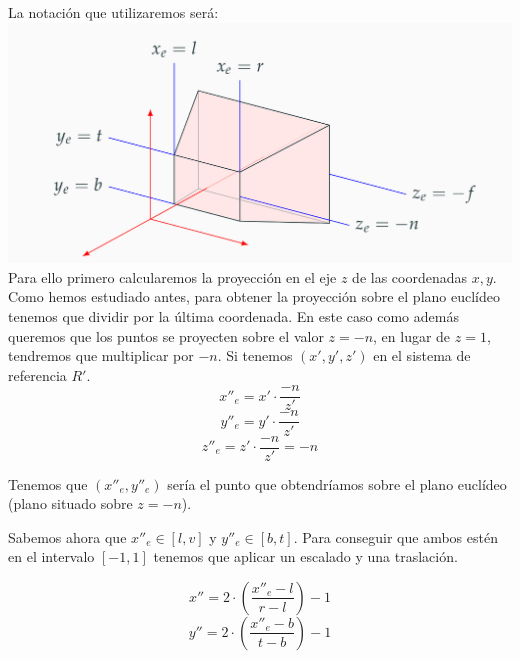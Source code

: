 \documentclass[a4paper,11pt, oneside]{book}
\begin{document}
La notación que utilizaremos será:
\\

\includegraphics[scale=0.2]{notacion}
\\

Para ello primero calcularemos la proyección en el eje $z$ de las coordenadas $x,y$. Como hemos estudiado antes, para obtener la proyección sobre el plano euclídeo tenemos que dividir por la última coordenada. En este caso como además queremos que los puntos se proyecten sobre el valor $z=-n$, en lugar de $z=1$, tendremos que multiplicar por $-n$. Si tenemos $(x',y',z')$ en el sistema de referencia $R'$.
\begin{equation}
x''_e = x'\cdot\frac{-n}{z'}
\end{equation}
\begin{equation}
y''_e = y'\cdot\frac{-n}{z'}
\end{equation}
\begin{equation}
z''_e = z'\cdot\frac{-n}{z'} = -n
\end{equation}

Tenemos que $(x''_e,y''_e)$ sería el punto que obtendríamos sobre el plano euclídeo (plano situado sobre $z=-n$).

Sabemos ahora que $x''_e \in [l,v]$ y $y''_e \in [b,t]$. Para conseguir que ambos estén en el intervalo $[-1,1]$ tenemos que aplicar un escalado y una traslación. 

\begin{equation}
x'' = 2\cdot(\frac{x''_e-l}{r-l})-1
\end{equation}
\begin{equation}
y'' = 2\cdot(\frac{x''_e-b}{t-b})-1
\end{equation}
\end{document}
